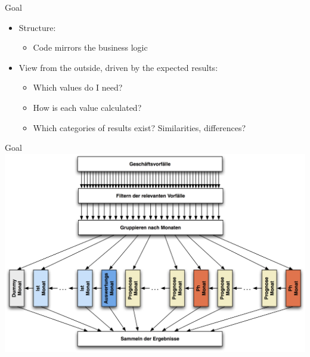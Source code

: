 \begin{frame}[fragile]{Goal}
\begin{itemize}
\item Structure:
\begin{itemize}
\item Code mirrors the business logic
\end{itemize}
\end{itemize}

\begin{itemize}
\item View from the outside, driven by the expected results:
\begin{itemize}
\item Which values do I need?
\item How is each value calculated?
\item Which categories of results exist? Similarities, differences?
\end{itemize}
\end{itemize}
\end{frame}

\begin{frame}[fragile]{Goal}
\includegraphics[width=.85 \paperwidth]{DynamischFein.jpg}
\end{frame}


